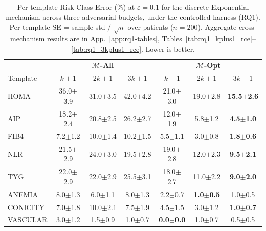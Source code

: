 \providecommand{\pmstd}[1]{{\scriptsize $\pm$#1}}

\begin{table}[t]
\centering
\setlength{\tabcolsep}{2pt}
\small
\caption{Per-template Risk Class Error (\%) at $\varepsilon = 0.1$ for the discrete Exponential mechanism across three adversarial budgets, under the controlled harness (RQ1). Per-template SE = sample std / $\sqrt{n}$ over patients ($n = 200$). Aggregate cross-mechanism results are in App.~\ref{app:rq1-tables}, Tables~\ref{tab:rq1_kplus1_rce}--\ref{tab:rq1_3kplus1_rce}. Lower is better.}
\label{tab:rce_per_template_rq1}
\begin{tabular}{l|ccc|ccc}
\toprule
& \multicolumn{3}{c|}{\textbf{$\mathcal{M}$-All}} & \multicolumn{3}{c}{\textbf{$\mathcal{M}$-Opt}} \\
Template & $k{+}1$ & $2k{+}1$ & $3k{+}1$ & $k{+}1$ & $2k{+}1$ & $3k{+}1$ \\
\midrule
HOMA & 36.0\pmstd{3.9} & 31.0\pmstd{3.5} & 42.0\pmstd{4.2} & 21.0\pmstd{3.0} & 19.0\pmstd{2.8} & \textbf{15.5\pmstd{2.6}} \\
AIP & 18.2\pmstd{2.4} & 20.8\pmstd{2.5} & 26.2\pmstd{2.7} & 12.0\pmstd{1.9} & 5.8\pmstd{1.2} & \textbf{4.5\pmstd{1.0}} \\
FIB4 & 7.2\pmstd{1.2} & 10.0\pmstd{1.4} & 10.2\pmstd{1.5} & 5.5\pmstd{1.1} & 3.0\pmstd{0.8} & \textbf{1.8\pmstd{0.6}} \\
NLR & 21.5\pmstd{2.9} & 24.0\pmstd{3.0} & 19.5\pmstd{2.8} & 19.0\pmstd{2.8} & 12.0\pmstd{2.3} & \textbf{9.5\pmstd{2.1}} \\
TYG & 22.0\pmstd{2.9} & 22.0\pmstd{2.9} & 25.5\pmstd{3.1} & 18.0\pmstd{2.7} & 11.0\pmstd{2.2} & \textbf{9.0\pmstd{2.0}} \\
ANEMIA & 8.0\pmstd{1.3} & 6.0\pmstd{1.1} & 8.0\pmstd{1.3} & 2.2\pmstd{0.7} & \textbf{1.0\pmstd{0.5}} & 1.0\pmstd{0.5} \\
CONICITY & 7.0\pmstd{1.8} & 10.0\pmstd{2.1} & 7.5\pmstd{1.9} & 4.5\pmstd{1.5} & 3.0\pmstd{1.2} & \textbf{1.0\pmstd{0.7}} \\
VASCULAR & 3.0\pmstd{1.2} & 1.5\pmstd{0.9} & 1.0\pmstd{0.7} & \textbf{0.0\pmstd{0.0}} & 1.0\pmstd{0.7} & 0.5\pmstd{0.5} \\
\bottomrule
\end{tabular}
\end{table}
